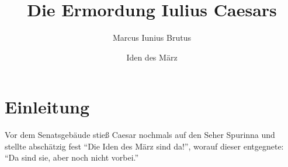 \documentclass{scrartcl}
\title{Die Ermordung
  Iulius Caesars}
\author{Marcus Iunius Brutus}
\date{Iden des März}
\begin{document}
  \maketitle
  \section{Einleitung}
  Vor dem Senatsgebäude stieß
  Caesar nochmals auf den Seher
  Spurinna und stellte
  abschätzig fest \enquote{Die
  Iden des März sind da!},
  worauf dieser entgegnete:
  \enquote{Da sind sie, aber
  noch nicht vorbei.}
\end{document}
